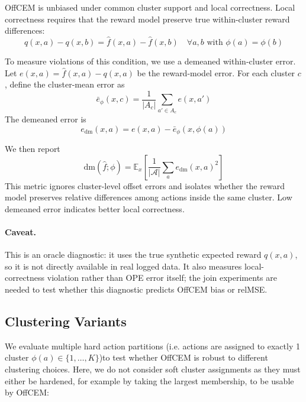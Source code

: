 \documentclass[11pt]{article}
\newcommand{\dm}{\mathrm{dm}}
\begin{document}
OffCEM is unbiased under common cluster support and local correctness. Local correctness requires that the reward model preserve true within-cluster reward differences:
$$ q(x,a)-q(x,b) = \hat f(x,a)-\hat f(x,b) \quad \forall a,b \text{ with } \phi(a)=\phi(b)$$

To measure violations of this condition, we use a demeaned within-cluster error. Let $ e(x,a)=\hat f(x,a)-q(x,a)$
be the reward-model error. For each cluster $c$, define the cluster-mean error as
$$ \bar e_\phi(x,c) = \frac{1}{|A_c|} \sum_{a'\in A_c} e(x,a')$$
The demeaned error is
$$  e_{\mathrm{dm}}(x,a) = e(x,a)-\bar e_\phi(x,\phi(a))$$

We then report
$$ \dm(\hat f;\phi) = \mathbb{E}_x \left[\frac{1}{|\mathcal{A}|}\sum_a e_{\mathrm{dm}}(x,a)^2 \right]$$
This metric ignores cluster-level offset errors and isolates whether the reward model preserves relative differences among actions inside the same cluster. Low demeaned error indicates better local correctness.

\paragraph{Caveat.}
This is an oracle diagnostic: it uses the true synthetic expected reward $q(x,a)$, so it is not directly available in real logged data. It also measures local-correctness violation rather than OPE error itself; the join experiments are needed to test whether this diagnostic predicts OffCEM bias or relMSE.

\subsection{Clustering Variants}

We evaluate multiple hard action partitions  (i.e. actions are assigned to exactly 1 cluster $\phi(a) \in \{1,\ldots,K\}$)to test whether OffCEM is robust to different clustering choices. Here, we do not consider soft cluster assignments as they must either be hardened, for example by taking the largest membership, to be usable by OffCEM:
\end{document}
